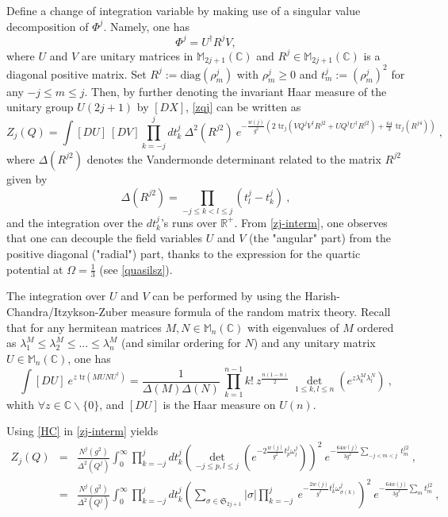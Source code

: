 \documentclass[a4paper,11pt,twoside]{article}
\numberwithin{equation}{section}
\theoremstyle{nonumberplain}
\newcounter{and}
\begin{document}
Define a change of integration variable by making use of a singular value decomposition of $\Phi^j$. Namely, one has%
%
\begin{equation}
\Phi^j=U^\dag R^jV, 
\end{equation}
%
where $U$ and $V$ are unitary matrices in $\mathbb{M}_{2j+1}(\mathbb{C})$ and $R^j\in\mathbb{M}_{2j+1}(\mathbb{C})$ is a diagonal positive matrix. Set $R^j:=\text{diag}(\rho^j_{m})$ with $\rho^j_m\ge0$ and $t^j_m:=(\rho^{j}_m)^2$ for any $-j\le m\le j$. Then, by further denoting the invariant Haar measure of the unitary group $U(2j+1)$ by $[DX]$, \eqref{zqj} can be written as%
%
\begin{equation}
Z_j(Q) = \int [DU] \ [DV] \prod_{k=-j}^j dt^j_k \ \Delta^2\left(R^{j2}\right) \ e^{-\frac{w(j)}{g^2}\left(2\mbox{ tr}_j(VQ^jV^\dag R^{j2}+UQ^jU^\dag R^{j2})+\frac{64}{3}\mbox{ tr}_j(R^{j4})\right)} \ , \label{zj-interm}
\end{equation}
%
where $\Delta(R^{j2})$ denotes the Vandermonde determinant related to the matrix $R^{j2}$ given by%
%
\begin{equation}
\Delta(R^{j2}) = \prod_{-j\le k<l\le j} \left(t^{j}_l-t^{j}_k\right) \ , \label{vanderrho2}
\end{equation}
%
and the integration over the $dt^j_k$'s runs over $\mathbb{R}^+$. From \eqref{zj-interm}, one observes that one can decouple the field variables $U$ and $V$ (the "angular" part) from the positive diagonal ("radial") part, thanks to the expression for the quartic potential at $\Omega=\frac{1}{3}$ (see \eqref{quasilsz}).\par%
The integration over $U$ and $V$ can be performed by using the Harish-Chandra/Itzykson-Zuber measure formula of the random matrix theory. Recall that for any hermitean matrices $M,N\in\mathbb{M}_n(\mathbb{C})$ with eigenvalues of $M$ ordered as $\lambda^M_1\le\lambda^M_2\le...\le\lambda^M_n$ (and similar ordering for $N$) and any unitary matrix $U\in\mathbb{M}_n(\mathbb{C})$, one has%
%
\begin{equation}
\int[DU] \ e^{z\mbox{ tr}(MUNU^\dag)} = \frac{1}{\Delta(M)\Delta(N)} \ \prod_{k=1}^{n-1}k! \ z^{\frac{n(1-n)}{2}} \ \det_{1\le k,l\le n}\left(e^{z\lambda^M_k\lambda^N_l}\right) \ , \label{HC}
\end{equation}
%
whith $\forall z\in\mathbb{C} \backslash \{0\}$, and $[DU]$ is the Haar measure on $U(n)$. \par%
%
Using \eqref{HC} in \eqref{zj-interm} yields%
%
\begin{eqnarray}
Z_j(Q) &=& \frac{N^j(g^2)}{\Delta^2(Q^j)} \int_0^\infty \prod_{k=-j}^j dt^j_k\left( \det_{-j\le p,l\le j}\left(e^{-2\frac{w(j)}{g^2}t^j_p\omega^j_{l}}\right)\right)^2 \ e^{-\frac{64w(j)}{3g^2} \underset{-j<m<j}{\sum} \ t^{j2}_m} \ , \label{zj-partial} \\
&=& \frac{N^j(g^2)}{\Delta^2(Q^j)} \int_0^\infty \prod_{k=-j}^j dt^j_k \left( \sum_{\sigma\in\mathfrak{S}_{2j+1}} \left|\sigma\right| \prod_{k=-j}^j \ e^{-\frac{2w(j)}{g^2}t^j_k\omega^j_{\sigma(k)}} \right)^2 \ e^{-\frac{64w(j)}{3g^2} \underset{m}{\sum} t^{j2}_m} \ , \nonumber \label{zj-partialbis} \\
&&
\end{eqnarray}
\end{document}
